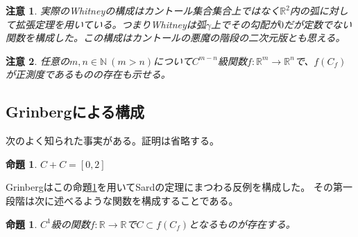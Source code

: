 \documentclass[leqno]{jsarticle}
\newtheorem{prop}[thm]{命題}
\newtheorem*{cau}{注意}
\newcommand{\nn}{\mathbb{N}}
\newcommand{\rr}{\mathbb{R}}
\begin{document}
\begin{cau}
実際のWhitneyの構成はカントール集合集合上ではなく$\rr^2$内の弧に対して拡張定理を用いている。つまりWhitneyは弧$\gamma$上でその勾配が$0$だが定数でない関数を構成した。この構成はカントールの悪魔の階段の二次元版とも思える。
\end{cau}
\begin{cau}
任意の$m,n\in \nn\ (m>n)$について$C^{m-n}$級関数$f:\rr^m\to \rr^n$で、$f(C_f)$が正測度であるものの存在も示せる。
\end{cau}

\subsection{Grinbergによる構成}
次のよく知られた事実がある。証明は省略する。
\begin{prop}\label{cc02}
$C+C=[0,2]$
\end{prop}
Grinbergはこの命題\ref{cc02}を用いてSardの定理にまつわる反例を構成した。
その第一段階は次に述べるような関数を構成することである。
\begin{prop}\label{cfcf}
$C^1$級の関数$f:\rr\to \rr$で$C\subset f(C_f)$となるものが存在する。
\end{prop}
\end{document}
